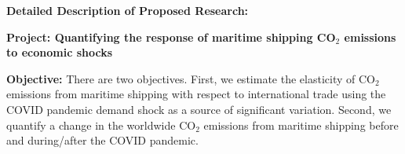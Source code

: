 \documentclass[hidelinks, 12pt,letterpaper]{article}
\begin{document}




\begin{center}
\textbf{Detailed Description of Proposed Research: }\vspace{-0.25cm}
\end{center}

\noindent \textbf{Project: Quantifying the response of maritime shipping CO$_2$ emissions to economic shocks}
\smallskip

\noindent \textbf{Objective:} There are two objectives. First, we estimate the elasticity of CO$_2$ emissions from maritime shipping with respect to international trade using the COVID pandemic demand shock as a source of significant variation. Second, we quantify a change in the worldwide CO$_2$ emissions from maritime shipping before and during/after the COVID pandemic.
\smallskip
\end{document}

